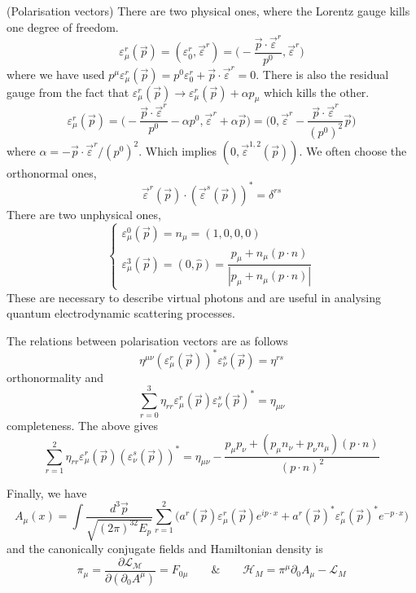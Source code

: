 \vspace{2ex}
\begin{defi}
(Polarisation vectors) There are two physical ones, where the Lorentz gauge kills one degree of freedom.
\[\varepsilon ^{r}_{\mu }(\vec{p})=(\varepsilon _{0}^{r},\vec{\varepsilon }^{r})=\Big(-\dfrac{\vec{p}\cdot \vec{\varepsilon }^{r}}{p^{0}},\vec{\varepsilon }^{r}\Big)\]
where we have used $p^{\mu }\varepsilon ^{r}_{\mu }(\vec{p})=p^{0}\varepsilon _{0}^{r}+\vec{p}\cdot \vec{\varepsilon }^{r}=0$. There is also the residual gauge from the fact that $\varepsilon ^{r}_{\mu }(\vec{p})\rightarrow \varepsilon ^{r}_{\mu }(\vec{p})+\alpha p_{\mu }$ which kills the other.
\[\varepsilon ^{r}_{\mu }(\vec{p})=\Big(-\dfrac{\vec{p}\cdot \vec{\varepsilon }^{r}}{p^{0}}-\alpha p^{0},\vec{\varepsilon }^{r}+\alpha \vec{p}\Big)=\Big(0,\vec{\varepsilon }^{r}-\dfrac{\vec{p}\cdot \vec{\varepsilon }^{r}}{(p^{0})^2}\vec{p}\Big)\]
where $\alpha =-\vec{p}\cdot \vec{\varepsilon }^{r}/(p^{0})^2$. Which implies $(0,\vec{\varepsilon }^{1,2}(\vec{p}))$. We often choose the orthonormal ones,
\[\vec{\varepsilon }^{r}(\vec{p})\cdot (\vec{\varepsilon }^{s}(\vec{p}))^{*}=\delta ^{rs}\]
There are two unphysical ones,
\[\begin{cases}
\varepsilon ^{0}_{\mu }(\vec{p})=n _{\mu }=(1,0,0,0)\\
\varepsilon ^{3}_{\mu }(\vec{p})=(0,\hat{p})=\dfrac{p_{\mu }+n_{\mu }(p\cdot n)}{|p_{\mu }+n_{\mu }(p\cdot n)|}
\end{cases}\]
These are necessary to describe virtual photons and are useful in analysing quantum electrodynamic scattering processes.
\end{defi}
\vspace{2ex}
\begin{thm}
The relations between polarisation vectors are as follows
\[\eta ^{\mu \nu}(\varepsilon ^{r}_{\mu }(\vec{p}))^{*}\varepsilon ^{s}_{\nu }(\vec{p})=\eta ^{rs}\]
orthonormality and
\[\sum ^{3}_{r=0}\eta _{rr}\varepsilon ^{r}_{\mu }(\vec{p})\varepsilon _{\nu }^{s}(\vec{p})^{*}=\eta _{\mu \nu }\]
completeness. The above gives
\[\sum ^{2}_{r=1}\eta _{rr}\varepsilon ^{r}_{\mu }(\vec{p})(\varepsilon ^{s}_{\nu }(\vec{p}))^{*}=\eta _{\mu \nu }-\dfrac{p_{\mu }p_{\nu }+(p_{\mu }n_{\nu }+p_{\nu }n_{\mu })(p\cdot n)}{(p\cdot n)^2}\]
\end{thm}
\vspace{2ex}
\begin{prop}
Finally, we have
\[A_{\mu }(x)=\int \dfrac{d^3\vec{p}}{\sqrt{(2\pi )^32E_{p}}}\sum ^{2}_{r=1}\Big(a^{r}(\vec{p})\varepsilon ^{r}_{\mu }(\vec{p})e^{ip\cdot x}+a^{r}(\vec{p})^{*}\varepsilon ^{r}_{\mu }(\vec{p})^{*}e^{-p\cdot x}\Big)\]
and the canonically conjugate fields and Hamiltonian density is 
\[\pi _{\mu }=\dfrac{\partial \mathcal{L_{M}}}{\partial (\partial _{0}A^{\mu })}=F_{0\mu }\qquad\&\qquad \mathcal{H}_{M}=\pi ^{\mu }\partial _{0}A_{\mu }-\mathcal{L}_{M} \]
\end{prop}
